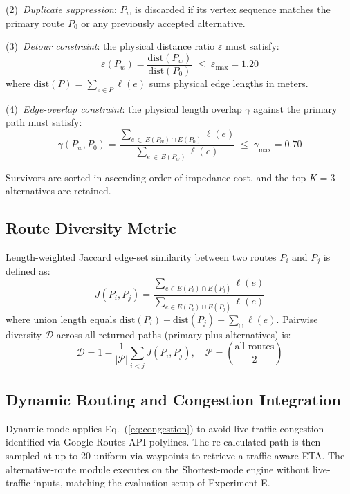 \documentclass[11pt,conference]{IEEEtran}
\begin{document}
(2)~\textit{Duplicate suppression}: $P_w$ is discarded if its vertex sequence matches the primary route $P_0$ or any previously accepted alternative.

(3)~\textit{Detour constraint}: the physical distance ratio $\varepsilon$ must satisfy:
\begin{equation}
  \varepsilon(P_w) = \frac{\mathrm{dist}(P_w)}{\mathrm{dist}(P_0)} \;\le\; \varepsilon_{\max} = 1.20
  \label{eq:detour}
\end{equation}
where $\mathrm{dist}(P) = \sum_{e\in P} \ell(e)$ sums physical edge lengths in meters.

(4)~\textit{Edge-overlap constraint}: the physical length overlap $\gamma$ against the primary path must satisfy:
\begin{equation}
  \gamma(P_w, P_0) = \frac{\sum_{e\,\in\, E(P_w)\cap E(P_0)}\ell(e)}{\sum_{e\,\in\, E(P_w)}\ell(e)} \;\le\; \gamma_{\max} = 0.70
  \label{eq:overlap}
\end{equation}

Survivors are sorted in ascending order of impedance cost, and the top $K=3$ alternatives are retained.

\subsection{Route Diversity Metric}

Length-weighted Jaccard edge-set similarity between two routes $P_i$ and $P_j$ is defined as:
\begin{equation}
  J(P_i, P_j) = \frac{\sum_{e\in E(P_i)\cap E(P_j)}\ell(e)}{\sum_{e\in E(P_i)\cup E(P_j)}\ell(e)}
  \label{eq:jaccard}
\end{equation}
where union length equals $\mathrm{dist}(P_i) + \mathrm{dist}(P_j) - \sum_\cap\ell(e)$.
Pairwise diversity $\mathcal{D}$ across all returned paths (primary plus alternatives) is:
\begin{equation}
  \mathcal{D} = 1 - \frac{1}{|\mathcal{P}|}\sum_{i < j} J(P_i, P_j), \quad \mathcal{P} = \binom{\text{all routes}}{2}
  \label{eq:diversity}
\end{equation}

\subsection{Dynamic Routing and Congestion Integration}

Dynamic mode applies Eq.~(\ref{eq:congestion}) to avoid live traffic congestion identified via Google Routes API polylines.
The re-calculated path is then sampled at up to 20 uniform via-waypoints to retrieve a traffic-aware ETA.
The alternative-route module executes on the Shortest-mode engine without live-traffic inputs, matching the evaluation setup of Experiment E.
\end{document}
